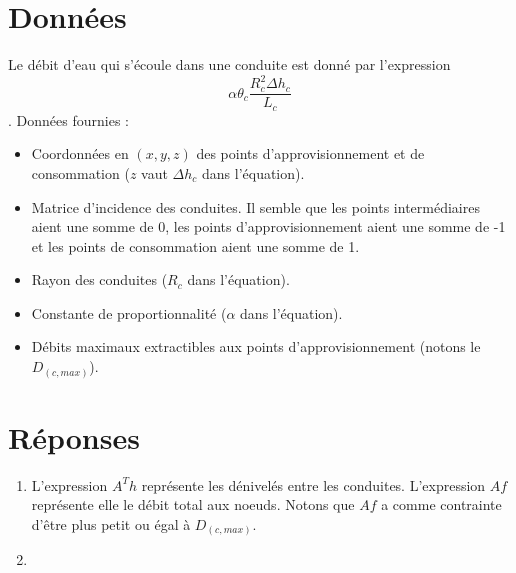 \documentclass[french]{article}
\begin{document}
\section{Données}
Le débit d'eau qui s'écoule dans une conduite est donné par l'expression $$\alpha\theta_c\frac{R^2_c\Delta h_c}{L_c}$$.
Données fournies :
\begin{itemize}
	\item 
		Coordonnées en $(x,y,z)$ des points d'approvisionnement et de consommation ($z$ vaut $\Delta h_c$ dans l'équation).
	\item 
		Matrice d'incidence des conduites.
		Il semble que les points intermédiaires aient une somme de 0, les points d'approvisionnement aient une somme de -1 et les points de consommation aient une somme de 1.
	\item
		Rayon des conduites ($R_c$ dans l'équation).
	\item
		Constante de proportionnalité ($\alpha$ dans l'équation).
	\item
		Débits maximaux extractibles aux points d'approvisionnement (notons le $D_(c,max)$).
\end{itemize}
\section{Réponses}
\begin{enumerate}
	\item 
		L'expression $A^T h$ représente les dénivelés entre les conduites.
		L'expression $Af$ représente elle le débit total aux noeuds.
		Notons que $Af$ a comme contrainte d'être plus petit ou égal à $D_(c,max)$.
	\item 
		
\end{enumerate}
\end{document}
